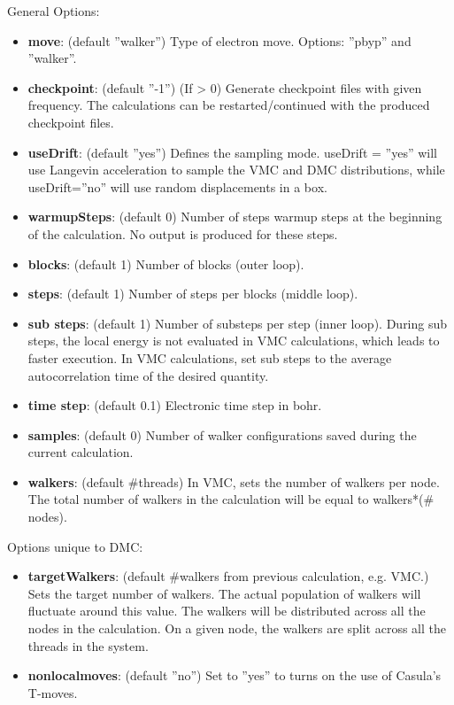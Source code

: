 General Options:
\begin{itemize}
\item{\textbf{move}: (default ”walker”) Type of electron move. Options: ”pbyp” and ”walker”.}
\item{\textbf{checkpoint}: (default ”-1”) (If > 0) Generate checkpoint files with given frequency.
The calculations can be restarted/continued with the produced checkpoint files.}
\item{\textbf{useDrift}: (default ”yes”) Defines the sampling mode. useDrift = ”yes” will
use Langevin acceleration to sample the VMC and DMC distributions, while
useDrift=”no” will use random displacements in a box.}
\item{\textbf{warmupSteps}: (default 0) Number of steps warmup steps at the beginning of the
calculation. No output is produced for these steps.}
\item{\textbf{blocks}: (default 1) Number of blocks (outer loop).}
\item{\textbf{steps}: (default 1) Number of steps per blocks (middle loop).}
\item{\textbf{sub steps}: (default 1) Number of substeps per step (inner loop). During sub steps,
the local energy is not evaluated in VMC calculations, which leads to faster execution.
In VMC calculations, set sub steps to the average autocorrelation time of the desired
quantity.}
\item{\textbf{time step}: (default 0.1) Electronic time step in bohr.}
\item{\textbf{samples}: (default 0) Number of walker configurations saved during the current 
calculation.}
\item{\textbf{walkers}: (default \#threads) In VMC, sets the number of walkers per node. The total
number of walkers in the calculation will be equal to walkers*(\# nodes).}
\end{itemize}

Options unique to DMC:
\begin{itemize}
\item{\textbf{targetWalkers}: (default \#walkers from previous calculation, e.g. VMC.) Sets the
target number of walkers. The actual population of walkers will fluctuate around this
value. The walkers will be distributed across all the nodes in the calculation. On a
given node, the walkers are split across all the threads in the system.}
\item{\textbf{nonlocalmoves}: (default ”no”) Set to ”yes” to turns on the use of Casula’s T-moves.}
\end{itemize}


